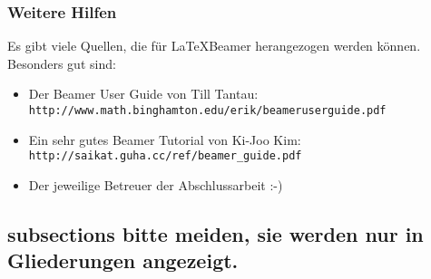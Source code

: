 \begin{frame}
  \frametitle{Weitere Hilfen}

  Es gibt viele Quellen, die für \LaTeX Beamer herangezogen werden können. Besonders gut sind:
  \begin{itemize}
    \item Der Beamer User Guide von Till Tantau:\\\texttt{http://www.math.binghamton.edu/erik/beameruserguide.pdf}
    \item Ein sehr gutes Beamer Tutorial von Ki-Joo Kim:\\\texttt{http://saikat.guha.cc/ref/beamer\_guide.pdf}
    \item Der jeweilige Betreuer der Abschlussarbeit :-)
  \end{itemize}

\end{frame}

\subsection{subsections bitte meiden, sie werden nur in Gliederungen angezeigt.}
